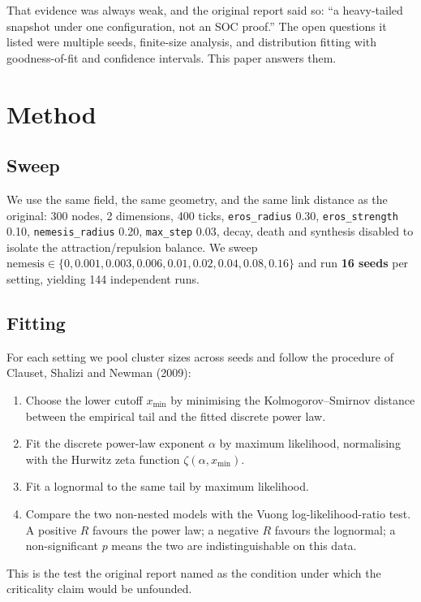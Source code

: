 \documentclass[11pt]{article}
\begin{document}
That evidence was always weak, and the original report said so:
``a heavy-tailed snapshot under one configuration, not an SOC proof.''
The open questions it listed were multiple seeds, finite-size analysis,
and distribution fitting with goodness-of-fit and confidence intervals.
This paper answers them.

\section{Method}

\subsection{Sweep}

We use the same field, the same geometry, and the same link distance as the
original: 300 nodes, 2 dimensions, 400 ticks, \texttt{eros\_radius} 0.30,
\texttt{eros\_strength} 0.10, \texttt{nemesis\_radius} 0.20,
\texttt{max\_step} 0.03, decay, death and synthesis disabled to isolate the
attraction/repulsion balance. We sweep
$\text{nemesis} \in \{0, 0.001, 0.003, 0.006, 0.01, 0.02, 0.04, 0.08, 0.16\}$
and run \textbf{16 seeds} per setting, yielding 144 independent runs.

\subsection{Fitting}

For each setting we pool cluster sizes across seeds and follow the
procedure of Clauset, Shalizi and Newman (2009):

\begin{enumerate}
\item Choose the lower cutoff $x_{\min}$ by minimising the
  Kolmogorov--Smirnov distance between the empirical tail and the fitted
  discrete power law.
\item Fit the discrete power-law exponent $\alpha$ by maximum likelihood,
  normalising with the Hurwitz zeta function $\zeta(\alpha, x_{\min})$.
\item Fit a lognormal to the same tail by maximum likelihood.
\item Compare the two non-nested models with the Vuong
  log-likelihood-ratio test. A positive $R$ favours the power law; a
  negative $R$ favours the lognormal; a non-significant $p$ means the two
  are indistinguishable on this data.
\end{enumerate}

This is the test the original report named as the condition under which
the criticality claim would be unfounded.
\end{document}
